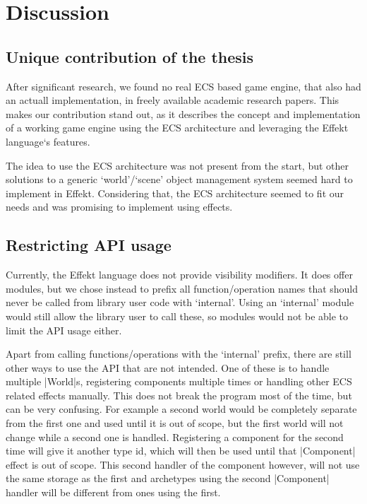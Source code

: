 \chapter{Discussion}\label{chap:discussion}

\section{Unique contribution of the thesis}

After significant research, we found no real ECS based game engine, that also had an actuall implementation, in freely available academic research papers. This makes our contribution stand out, as it describes the concept and implementation of a working game engine using the ECS architecture and leveraging the Effekt language`s features.

The idea to use the ECS architecture was not present from the start, but other solutions to a generic `world'/`scene' object management system seemed hard to implement in Effekt. Considering that, the ECS architecture seemed to fit our needs and was promising to implement using effects.

\section{Restricting API usage}

Currently, the Effekt language does not provide visibility modifiers. It does offer modules, but we chose instead to prefix all function/operation names that should never be called from library user code with `internal'. Using an `internal' module would still allow the library user to call these, so modules would not be able to limit the API usage either.

Apart from calling functions/operations with the `internal' prefix, there are still other ways to use the API that are not intended. One of these is to handle multiple |World|s, registering components multiple times or handling other ECS related effects manually. This does not break the program most of the time, but can be very confusing. For example a second world would be completely separate from the first one and used until it is out of scope, but the first world will not change while a second one is handled. Registering a component for the second time will give it another type id, which will then be used until that |Component| effect is out of scope. This second handler of the component however, will not use the same storage as the first and archetypes using the second |Component| handler will be different from ones using the first.

